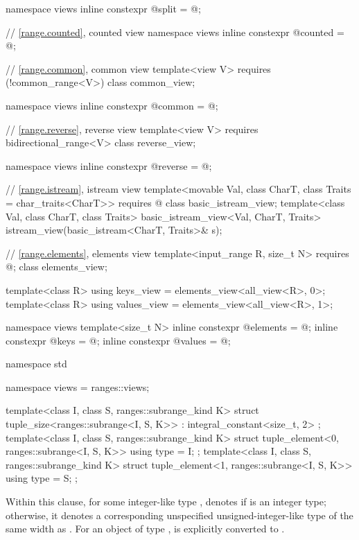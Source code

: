 \begin{codeblock}
{  namespace views { inline constexpr @\unspec@ split = @\unspec@; }

  // \ref{range.counted}, counted view
  namespace views { inline constexpr @\unspec@ counted = @\unspec@; }

  // \ref{range.common}, common view
  template<view V>
    requires (!common_range<V>)
  class common_view;

  namespace views { inline constexpr @\unspec@ common = @\unspec@; }

  // \ref{range.reverse}, reverse view
  template<view V>
    requires bidirectional_range<V>
  class reverse_view;

  namespace views { inline constexpr @\unspec@ reverse = @\unspec@; }

  // \ref{range.istream}, istream view
  template<movable Val, class CharT, class Traits = char_traits<CharT>>
    requires @\seebelow@
  class basic_istream_view;
  template<class Val, class CharT, class Traits>
    basic_istream_view<Val, CharT, Traits> istream_view(basic_istream<CharT, Traits>& s);

  // \ref{range.elements}, elements view
  template<input_range R, size_t N>
    requires @\seebelow@;
  class elements_view;

  template<class R>
    using keys_view = elements_view<all_view<R>, 0>;
  template<class R>
    using values_view = elements_view<all_view<R>, 1>;

  namespace views {
    template<size_t N>
      inline constexpr @\unspec@ elements = @\unspec@ ;
    inline constexpr @\unspec@ keys = @\unspec@ ;
    inline constexpr @\unspec@ values = @\unspec@ ;
  }
}

namespace std {
  namespace views = ranges::views;

  template<class I, class S, ranges::subrange_kind K>
  struct tuple_size<ranges::subrange<I, S, K>>
    : integral_constant<size_t, 2> {};
  template<class I, class S, ranges::subrange_kind K>
  struct tuple_element<0, ranges::subrange<I, S, K>> {
    using type = I;
  };
  template<class I, class S, ranges::subrange_kind K>
  struct tuple_element<1, ranges::subrange<I, S, K>> {
    using type = S;
  };
}
\end{codeblock}

\pnum
{}%
%
Within this clause,
for some integer-like type ,
 denotes
 if  is an integer type;
otherwise, it denotes a corresponding unspecified unsigned-integer-like type
of the same width as .
For an object  of type ,
 is
 explicitly converted to
.

